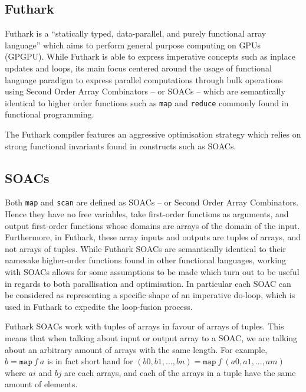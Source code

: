 \documentclass[11pt]{article}
\begin{document}
\subsection{Futhark}

Futhark is a ``statically typed, data-parallel, and purely functional array language'' \cite{futharklang} which aims to perform
 general purpose computing on GPUs (GPGPU). While Futhark is able to express imperative concepts such as inplace updates and loops, its main focus centered around the usage of
 functional language paradigm to express parallel computations through bulk operations using Second Order Array Combinators
 -- or SOACs -- which are semantically identical to higher order functions such as \texttt{map} and \texttt{reduce} commonly found in functional programming.

The Futhark compiler features an aggressive optimisation strategy which relies on strong functional invariants found in constructs such as SOACs.

\subsection{SOACs}
Both \texttt{map} and \texttt{scan} are defined as SOACs -- or Second Order Array Combinators. Hence they have no free variables, take first-order functions as arguments, and output first-order
 functions whose domains are arrays of the domain of the input. Furthermore, in Futhark, these array inputs and outputs are tuples of arrays, and not arrays of tuples.
While Futhark SOACs are semantically identical to their namesake higher-order functions found in other functional languages, working with SOACs allows for some assumptions to be made
 which turn out to be useful in regards to both parallisation and optimisation. In particular each SOAC can be considered as representing a specific shape of an imperative do-loop, which
 is used in Futhark to expedite the loop-fusion process. \cite[chap. 7]{MasterTroels}

Futhark SOACs work with tuples of arrays in favour of arrays of tuples. This means that when talking about input or output array to a SOAC, we are talking about an arbitrary amount of arrays with
 the same length. For example, $b = \mathtt{map} \: f \: a$ is in fact short hand for $(b0, b1,..., bn) = \mathtt{map} \: f \: (a0, a1, ..., am)$ where $ai$ and $bj$ are each arrays, and each of the arrays
 in a tuple have the same amount of
 elements.
\end{document}
